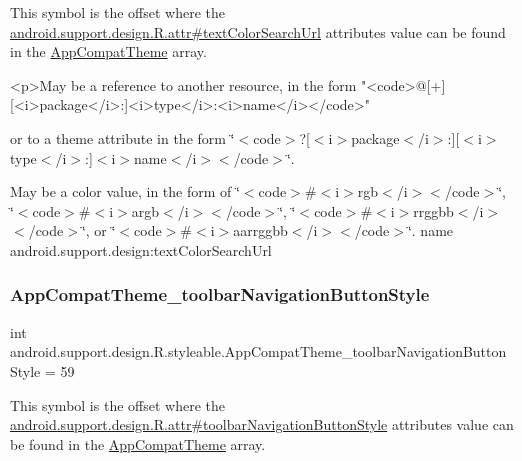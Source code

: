 This symbol is the offset where the \hyperlink{classandroid_1_1support_1_1design_1_1R_1_1attr_aa08a69e2042fd2d19b2b7adaf1fcfc8a}{android.\+support.\+design.\+R.\+attr\#text\+Color\+Search\+Url} attribute\textquotesingle{}s value can be found in the \hyperlink{classandroid_1_1support_1_1design_1_1R_1_1styleable_afb351dc8de20cbd4c89abe360373010c}{App\+Compat\+Theme} array.

\begin{DoxyVerb}      <p>May be a reference to another resource, in the form "<code>@[+][<i>package</i>:]<i>type</i>:<i>name</i></code>"
\end{DoxyVerb}
 or to a theme attribute in the form \char`\"{}$<$code$>$?\mbox{[}$<$i$>$package$<$/i$>$\+:\mbox{]}\mbox{[}$<$i$>$type$<$/i$>$\+:\mbox{]}$<$i$>$name$<$/i$>$$<$/code$>$\char`\"{}. 

May be a color value, in the form of \char`\"{}$<$code$>$\#$<$i$>$rgb$<$/i$>$$<$/code$>$\char`\"{}, \char`\"{}$<$code$>$\#$<$i$>$argb$<$/i$>$$<$/code$>$\char`\"{}, \char`\"{}$<$code$>$\#$<$i$>$rrggbb$<$/i$>$$<$/code$>$\char`\"{}, or \char`\"{}$<$code$>$\#$<$i$>$aarrggbb$<$/i$>$$<$/code$>$\char`\"{}.  name android.\+support.\+design\+:text\+Color\+Search\+Url \mbox{\label{classandroid_1_1support_1_1design_1_1R_1_1styleable_af3d0203e79964854fe14861e072e6ff3}} 
\subsubsection{\texorpdfstring{App\+Compat\+Theme\+\_\+toolbar\+Navigation\+Button\+Style}{AppCompatTheme\_toolbarNavigationButtonStyle}}
{\footnotesize\ttfamily int android.\+support.\+design.\+R.\+styleable.\+App\+Compat\+Theme\+\_\+toolbar\+Navigation\+Button\+Style = 59\hspace{0.3cm}{\ttfamily [static]}}

This symbol is the offset where the \hyperlink{classandroid_1_1support_1_1design_1_1R_1_1attr_a4a1cd4185adacb795ddeeb79bf2f84aa}{android.\+support.\+design.\+R.\+attr\#toolbar\+Navigation\+Button\+Style} attribute\textquotesingle{}s value can be found in the \hyperlink{classandroid_1_1support_1_1design_1_1R_1_1styleable_afb351dc8de20cbd4c89abe360373010c}{App\+Compat\+Theme} array.

